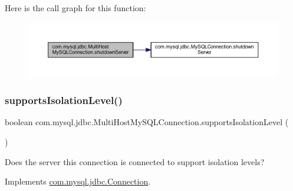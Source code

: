 Here is the call graph for this function\+:
\nopagebreak
\begin{figure}[H]
\begin{center}
\leavevmode
\includegraphics[width=350pt]{classcom_1_1mysql_1_1jdbc_1_1_multi_host_my_s_q_l_connection_a84e14d759493436465fa6bf6160e5153_cgraph}
\end{center}
\end{figure}
\mbox{\label{classcom_1_1mysql_1_1jdbc_1_1_multi_host_my_s_q_l_connection_a0c4936bc033352ae568d8ae567f6d495}} 
\subsubsection{\texorpdfstring{supports\+Isolation\+Level()}{supportsIsolationLevel()}}
{\footnotesize\ttfamily boolean com.\+mysql.\+jdbc.\+Multi\+Host\+My\+S\+Q\+L\+Connection.\+supports\+Isolation\+Level (\begin{DoxyParamCaption}{ }\end{DoxyParamCaption})}

Does the server this connection is connected to support isolation levels? 

Implements \mbox{\hyperlink{interfacecom_1_1mysql_1_1jdbc_1_1_connection_aea32f547f2d12d07de7792a6cdb20585}{com.\+mysql.\+jdbc.\+Connection}}.

